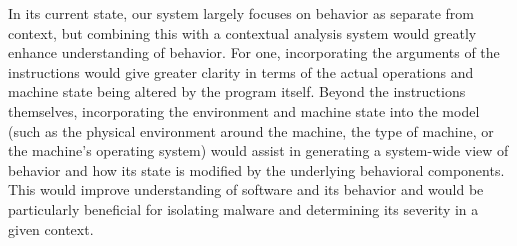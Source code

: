In its current state, our system largely focuses on behavior as separate from context, but combining this with a contextual analysis system would greatly enhance understanding of behavior. For one, incorporating the arguments of the instructions would give greater clarity in terms of the actual operations and machine state being altered by the program itself. Beyond the instructions themselves, incorporating the environment and machine state into the model (such as the physical environment around the machine, the type of machine, or the machine's operating system) would assist in generating a system-wide view of behavior and how its state is modified by the underlying behavioral components. This would improve understanding of software and its behavior and would be particularly beneficial for isolating malware and determining its severity in a given context.